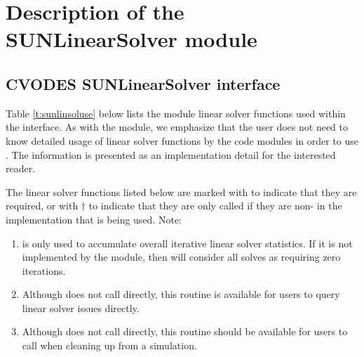 \chapter{Description of the SUNLinearSolver module}\label{s:sunlinsol}



\section{CVODES SUNLinearSolver interface}
\label{s:sunlinsol_interface}

Table \ref{t:sunlinsoluse} below lists the {\sunlinsol} module linear solver
functions used within the {\cvls} interface. As with the {\sunmatrix} module, we
emphasize that the {\cvodes} user does not need to know detailed usage of linear
solver functions by the {\cvodes} code modules in order to use {\cvodes}. The
information is presented as an implementation detail for the interested reader.

The linear solver functions listed below are marked with \cm to
indicate that they are required, or with $\dagger$ to indicate that
they are only called if they are non- in the {\sunlinsol}
implementation that is being used. Note:
\begin{enumerate}
\item {} is only used to accumulate overall
  iterative linear solver statistics.  If it is not implemented by
  the {\sunlinsol} module, then {\cvls} will consider all solves as
  requiring zero iterations.
\item Although {\cvls} does not call 
  directly, this routine is available for users to query linear solver
  issues directly.
\item Although {\cvls} does not call 
  directly, this routine should be available for users to call when
  cleaning up from a simulation.
\end{enumerate}


